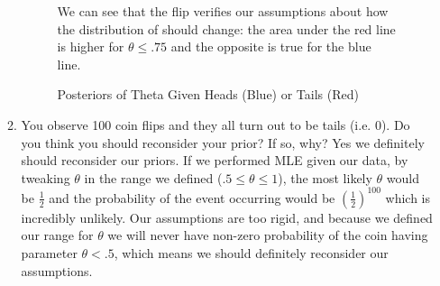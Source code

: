 \documentclass[12pt,twoside]{article}
\begin{document}
\begin{enumerate}
\begin{enumerate}
\begin{figure}[h!]
    \caption{Posteriors of Theta Given Heads (Blue) or Tails (Red)}
    \label{fig:my_label}
We can see that the flip verifies our assumptions about how the distribution of should change: the area under the red line is higher for $\theta\leq.75$ and the opposite is true for the blue line.
\end{figure}
\item You observe 100 coin flips and they all turn out to be tails (i.e. 0). Do you think you should reconsider your prior? If so, why?
\subitem
Yes we definitely should reconsider our priors. If we performed MLE given our data, by tweaking $\theta$ in the range we defined ($.5\leq \theta \leq1$), the most likely $\theta$ would be $\frac{1}{2}$ and the probability of the event occurring would be $(\frac{1}{2})^{100}$ which is incredibly unlikely. Our assumptions are too rigid, and because we defined our range for $\theta$ we will never have non-zero probability of the coin having parameter $\theta < .5$, which means we should definitely reconsider our assumptions.
\end{enumerate}


\end{enumerate}
\end{document}

